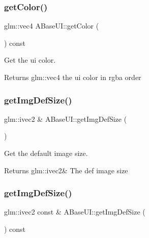 \subsubsection{\texorpdfstring{get\+Color()}{getColor()}}
{\footnotesize\ttfamily glm\+::vec4 A\+Base\+U\+I\+::get\+Color (\begin{DoxyParamCaption}{ }\end{DoxyParamCaption}) const\hspace{0.3cm}{\ttfamily [virtual]}}



Get the ui color. 

\begin{DoxyReturn}{Returns}
glm\+::vec4 the ui color in rgba order 
\end{DoxyReturn}
\mbox{\label{class_a_base_u_i_a92534c962d9421fe2a325dd29eed1455}} 
\subsubsection{\texorpdfstring{get\+Img\+Def\+Size()}{getImgDefSize()}\hspace{0.1cm}{\footnotesize\ttfamily [1/2]}}
{\footnotesize\ttfamily glm\+::ivec2 \& A\+Base\+U\+I\+::get\+Img\+Def\+Size (\begin{DoxyParamCaption}{ }\end{DoxyParamCaption})\hspace{0.3cm}{\ttfamily [virtual]}}



Get the default image size. 

\begin{DoxyReturn}{Returns}
glm\+::ivec2\& The def image size 
\end{DoxyReturn}
\mbox{\label{class_a_base_u_i_aeb6aad01bcd740bf18893cc7d3478cf1}} 
\subsubsection{\texorpdfstring{get\+Img\+Def\+Size()}{getImgDefSize()}\hspace{0.1cm}{\footnotesize\ttfamily [2/2]}}
{\footnotesize\ttfamily glm\+::ivec2 const  \& A\+Base\+U\+I\+::get\+Img\+Def\+Size (\begin{DoxyParamCaption}{ }\end{DoxyParamCaption}) const\hspace{0.3cm}{\ttfamily [virtual]}}



